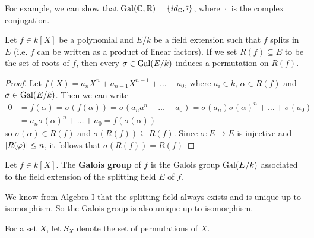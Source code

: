 For example, we can show that $\operatorname{Gal}(\mathbb{C},\mathbb{R}) = \{id_{\mathbb{C}}, \overline{\cdot}\}$, where $\overline{\cdot}$ is the complex conjugation. 

\begin{lem}[]\label{lem:2.4}
  Let $f \in k[X]$ be a polynomial and $E/k$ be a field extension such that $f$ splits in $E$ (i.e. $f$ can be written as a product of linear factors).
  If we set $R(f) \subseteq E$ to be the set of roots of $f$, then every $\sigma \in \operatorname{Gal}(E/k)$ induces a permutation on $R(f)$.
\end{lem}
\begin{proof}
  Let $f(X) = a_nX^{n} + a_{n-1}X^{n-1} + \ldots + a_0$, where $a_i \in k$, $\alpha \in R(f)$ and $\sigma \in \operatorname{Gal}(E/k)$.
  Then we can write
  \begin{align*}
    0 &= f(\alpha) = \sigma(f(\alpha)) = \sigma(a_na^{n} + \ldots + a_0) = \sigma(a_n)\sigma(\alpha)^{n} + \ldots + \sigma(a_0)\\
      &= a_n \sigma(\alpha)^{n} + \ldots + a_0 = f(\sigma(\alpha))
  \end{align*}
  so $\sigma(\alpha) \in R(f)$ and $\sigma(R(f)) \subseteq R(f)$.
  Since $\sigma: E \to  E$ is injective and $\vert R(\varphi)\vert\leq n$, it follows that $\sigma(R(f)) = R(f)$
\end{proof}

\begin{dfn}[]
  Let $f \in k[X]$. The \textbf{Galois group} of $f$ is the Galois group $\operatorname{Gal}(E/k)$ associated to the field extension of the splitting field $E$ of $f$.
\end{dfn}
We know from Algebra I that the splitting field always exists and is unique up to isomorphism. So the Galois group is also unique up to isomorphism.

For a set $X$, let $S_X$ denote the set of permutations of $X$.

